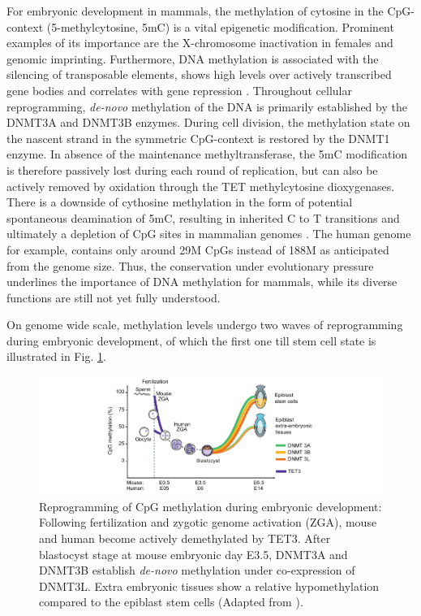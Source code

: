 For embryonic development in mammals, the methylation of cytosine in the CpG-context (5-methylcytosine, 5mC) is a vital epigenetic modification. Prominent examples of its importance are the X-chromosome inactivation in females and genomic imprinting.
Furthermore, DNA methylation is associated with the silencing of transposable elements, shows high levels over actively transcribed gene bodies and correlates with gene repression \cite{Greenberg2019}.
Throughout cellular reprogramming, \textit{de-novo} methylation of the DNA is primarily established by the DNMT3A and DNMT3B enzymes. 
During cell division, the methylation state on the nascent strand in the symmetric CpG-context is restored by the DNMT1 enzyme.
In absence of the maintenance methyltransferase, the 5mC modification is therefore passively lost during each round of replication, but can also be actively removed by oxidation through the TET methylcytosine dioxygenases.
There is a downside of cythosine methylation in the form of potential spontaneous deamination of 5mC, resulting in inherited C to T transitions and ultimately a depletion of CpG sites in mammalian genomes \cite{Holliday1993}. 
The human genome for example, contains only around 29M CpGs instead of 188M as anticipated from the genome size. 
Thus, the conservation under evolutionary pressure underlines the importance of DNA methylation for mammals, while its diverse functions are still not yet fully understood.


On genome wide scale, methylation levels undergo two waves of reprogramming during embryonic development, of which the first one till stem cell state is illustrated in Fig. \ref{fig:intro:methylation}.


\begin{figure}[h]
	\centering
	\includegraphics[width=1.0\textwidth]{figures/intro/methylation.pdf}
	\captionsetup{format=plain}
	\caption[DNA methylation reprogramming]{Reprogramming of CpG methylation during embryonic development: Following fertilization and zygotic genome activation (ZGA), mouse and human become actively demethylated by TET3. After blastocyst stage at mouse embryonic day E3.5, DNMT3A and DNMT3B establish \textit{de-novo} methylation under co-expression of DNMT3L. Extra embryonic tissues show a relative hypomethylation compared to the epiblast stem cells (Adapted from \cite{Greenberg2019}).}
	\label{fig:intro:methylation}
\end{figure}


